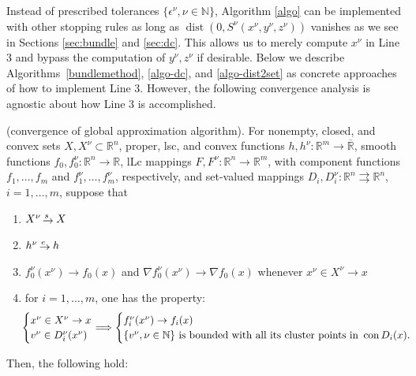 \documentclass[smallextended,envcountsect]{svjour3}
\newcommand{\tto}{\rightrightarrows}
\newcommand{\nats}{\mathbb{N}}
\newcommand{\reals}{\mathbb{R}}
\newcommand{\Reals}{\overline{\mathbb{R}}}
\DeclareMathOperator{\con}{con}
\DeclareMathOperator{\dist}{dist}
\newcommand{\sto}{\,{\lower 1pt\hbox{$\rightarrow$}}\kern -10pt
     \hbox{\raise 4pt \hbox{$\, \scriptstyle s$}}\hskip7pt}
\newcommand{\eto}{\,{\lower 1pt\hbox{$\rightarrow$}}\kern -10pt
     \hbox{\raise 4pt \hbox{$\, \scriptstyle e$}}\hskip7pt}
\begin{document}
Instead of prescribed tolerances $\{\epsilon^\nu, \nu\in\nats\}$, Algorithm \ref{algo} can be implemented with other stopping rules as long as $\dist(0, S^\nu(x^\nu,y^\nu,z^\nu))$ vanishes as we see in Sections \ref{sec:bundle} and \ref{sec:dc}. This allows us to merely compute $x^\nu$ in Line 3 and bypass the computation of $y^\nu,z^\nu$ if desirable. Below we describe Algorithms~\ref{bundlemethod}, \ref{algo-dc}, and \ref{algo-dist2set} as concrete approaches of how to implement Line 3. However, the following convergence analysis is agnostic about how Line 3 is accomplished.  


\begin{theorem}\label{thm:optim}{\rm (convergence of global approximation algorithm)}. 
For nonempty, closed, and convex sets $X,X^\nu\subset\reals^n$, proper, lsc, and convex functions $h,h^\nu:\reals^m\to \Reals$, smooth functions $f_0,f_0^\nu:\reals^n\to \reals$, lLc mappings $F,F^\nu:\reals^n\to \reals^m$, with component functions $f_1, \dots, f_m$ and $f_1^\nu, \dots, f_m^\nu$, respectively, and set-valued mappings $D_i,D_i^\nu:\reals^n\tto\reals^n$, $i = 1, \dots, m$, suppose that 
\begin{enumerate}[label=(\alph*), start=1]
\item $X^\nu\sto X$

\item $h^\nu\eto h$

\item $f_0^\nu(x^\nu)\to f_0(x)$ and $\nabla f_0^\nu(x^\nu) \to \nabla f_0(x)$ whenever $x^\nu\in X^\nu \to x$

\item for $i = 1, \dots, m$, one has the property: 
\begin{equation}\label{eqn:suffFconv}
\hspace{-0.15cm}  \begin{cases}
    x^\nu \in X^\nu \to x\\
    v^\nu \in D_i^\nu(x^\nu)
  \end{cases}
  \hspace{-0.35cm}\Longrightarrow 
  \begin{cases}
    f_i^\nu(x^\nu) \to f_i(x)\\
    \{v^\nu, \nu\in\nats\} \mbox{ is bounded with all its cluster points in } \con D_i(x).
  \end{cases}
\end{equation}
\end{enumerate}
Then, the following hold:
\begin{enumerate}[label=(\roman*), start=1]
% 


\end{enumerate}
\end{theorem}
\end{document}
